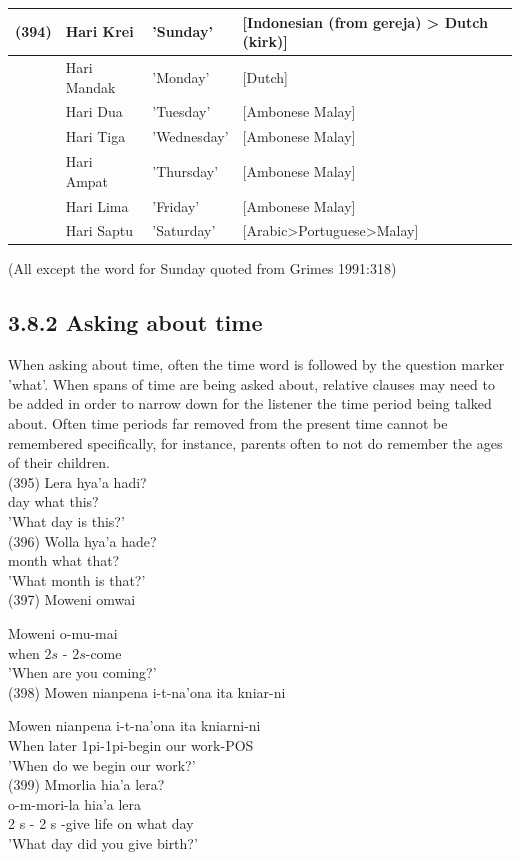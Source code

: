\documentclass[10pt]{article}
\begin{document}
\begin{center}
\begin{tabular}{|l|l|l|l|}
\hline
\multirow[t]{7}{*}{(394)} & Hari Krei & 'Sunday' & [Indonesian (from gereja) > Dutch (kirk)] \\
\hline
 & Hari Mandak & 'Monday' & [Dutch] \\
\hline
 & Hari Dua & 'Tuesday' & [Ambonese Malay] \\
\hline
 & Hari Tiga & 'Wednesday' & [Ambonese Malay] \\
\hline
 & Hari Ampat & 'Thursday' & [Ambonese Malay] \\
\hline
 & Hari Lima & 'Friday' & [Ambonese Malay] \\
\hline
 & Hari Saptu & 'Saturday' & [Arabic>Portuguese>Malay] \\
\hline
\end{tabular}
\end{center}

(All except the word for Sunday quoted from Grimes 1991:318)

\subsection*{3.8.2 Asking about time}
When asking about time, often the time word is followed by the question marker 'what'. When spans of time are being asked about, relative clauses may need to be added in order to narrow down for the listener the time period being talked about. Often time periods far removed from the present time cannot be remembered specifically, for instance, parents often to not do remember the ages of their children.\\
(395) Lera hya'a hadi?\\
day what this?\\
'What day is this?'\\
(396) Wolla hya'a hade?\\
month what that?\\
'What month is that?'\\
(397) Moweni omwai

Moweni o-mu-mai\\
when \(2 s\) - \(2 s\)-come\\
'When are you coming?'\\
(398) Mowen nianpena i-t-na'ona ita kniar-ni

Mowen nianpena i-t-na’ona ita kniarni-ni\\
When later 1pi-1pi-begin our work-POS\\
'When do we begin our work?'\\
(399) Mmorlia hia'a lera?\\
o-m-mori-la hia'a lera\\
2 s - 2 s -give life on what day\\
'What day did you give birth?'
\end{document}

